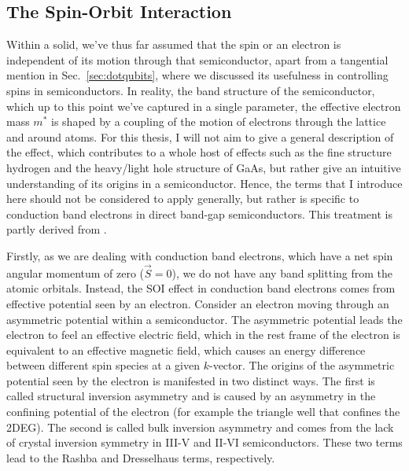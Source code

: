 \subsection{The Spin-Orbit Interaction}
\label{sec:SOI}
Within a solid, we've thus far assumed that the spin or an electron is independent of its motion through that semiconductor, apart from
a tangential mention in Sec.~\ref{sec:dotqubits}, where we discussed its usefulness in controlling spins in semiconductors. In reality, the
band structure of the semiconductor, which up to this point we've captured in a single parameter, the effective electron mass $m^*$ is shaped
by a coupling of the motion of electrons through the lattice and around atoms. For this thesis, I will not aim to give a general description of
the effect, which contributes to a whole host of effects such as the fine structure hydrogen and the heavy/light hole structure of GaAs,
but rather give an intuitive understanding of its origins in a semiconductor. Hence, the terms that
I introduce here should not be considered to apply generally, but rather is specific to conduction band electrons in direct band-gap semiconductors.
This treatment is partly derived from \cite{winkler2003spin,dyakonov2017spin}.

Firstly, as we are dealing with conduction band electrons, which have a net spin angular momentum of
zero ($\vec S = 0$), we do not have any band splitting from the atomic orbitals. Instead, the SOI effect in conduction band electrons comes from effective
potential seen by an electron. Consider an electron moving through an asymmetric potential within a semiconductor. The asymmetric potential leads the
electron to feel an effective electric field, which in the rest frame of the electron is equivalent to an effective magnetic field, which causes an energy difference
between different spin species at a given $k$-vector. The origins of the asymmetric potential seen by the electron is manifested in two distinct ways. The first is called structural inversion asymmetry and is caused by an asymmetry in the confining potential of the electron (for example the triangle well that confines the 2DEG). The second is called bulk inversion asymmetry and comes from the lack of crystal inversion symmetry in III-V and II-VI semiconductors. These two terms lead to the Rashba and Dresselhaus terms, respectively.

